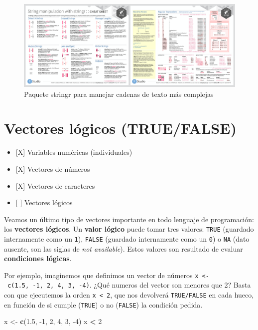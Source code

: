 \documentclass[11pt,]{book}
\newenvironment{Shaded}{\begin{snugshade}}{\end{snugshade}}
\newcommand{\DecValTok}[1]{\textcolor[rgb]{0.06,0.06,0.06}{#1}}
\newcommand{\FloatTok}[1]{\textcolor[rgb]{0.06,0.06,0.06}{#1}}
\newcommand{\KeywordTok}[1]{\textcolor[rgb]{0.27,0.27,0.27}{\textbf{#1}}}
\newcommand{\NormalTok}[1]{#1}
\newcommand{\OperatorTok}[1]{\textcolor[rgb]{0.43,0.43,0.43}{\textbf{#1}}}
\newcommand{\StringTok}[1]{\textcolor[rgb]{0.5,0.5,0.5}{#1}}
\providecommand{\tightlist}{%
  \setlength{\itemsep}{0pt}\setlength{\parskip}{0pt}}
\begin{document}
~

\begin{figure}
\includegraphics[width=17.08in]{./img/stringr} \caption{Paquete stringr para manejar cadenas de texto más complejas}\label{fig:stringr2}
\end{figure}

\hypertarget{vectores-luxf3gicos-truefalse}{%
\section{Vectores lógicos (TRUE/FALSE)}\label{vectores-luxf3gicos-truefalse}}

\begin{itemize}
\tightlist
\item
  {[}X{]} Variables numéricas (individuales)
\item
  {[}X{]} Vectores de números
\item
  {[}X{]} Vectores de caracteres
\item
  {[} {]} Vectores lógicos
\end{itemize}

Veamos un último tipo de vectores importante en todo lenguaje de programación: los \textbf{vectores lógicos}. Un \textbf{valor lógico} puede tomar tres valores: \texttt{TRUE} (guardado internamente como un \texttt{1}), \texttt{FALSE} (guardado internamente como un \texttt{0}) o \texttt{NA} (dato ausente, son las siglas de \emph{not available}). Estos valores son resultado de evaluar \textbf{condiciones lógicas}.

Por ejemplo, imaginemos que definimos un vector de números \texttt{x\ \textless{}-\ c(1.5,\ -1,\ 2,\ 4,\ 3,\ -4)}. ¿Qué numeros del vector son menores que 2? Basta con que ejecutemos la orden \texttt{x\ \textless{}\ 2}, que nos devolverá \texttt{TRUE/FALSE} en cada hueco, en función de si cumple (\texttt{TRUE}) o no (\texttt{FALSE}) la condición pedida.

\begin{Shaded}
\begin{Highlighting}[]
\NormalTok{x <-}\StringTok{ }\KeywordTok{c}\NormalTok{(}\FloatTok{1.5}\NormalTok{, }\DecValTok{-1}\NormalTok{, }\DecValTok{2}\NormalTok{, }\DecValTok{4}\NormalTok{, }\DecValTok{3}\NormalTok{, }\DecValTok{-4}\NormalTok{)}
\NormalTok{x }\OperatorTok{<}\StringTok{ }\DecValTok{2}
\end{Highlighting}
\end{Shaded}
\end{document}
